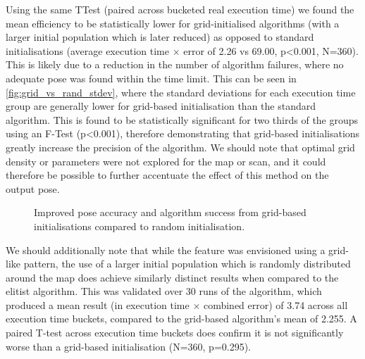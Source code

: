 \documentclass[authoryearcitations]{UoYCSproject}
\begin{document}
Using the same TTest (paired across bucketed real execution time) we found the mean efficiency to be statistically lower for grid-initialised algorithms (with a larger initial population which is later reduced) as opposed to standard initialisations (average execution time $\times$ error of 2.26 vs 69.00, p<0.001, N=360). This is likely due to a reduction in the number of algorithm failures, where no adequate pose was found within the time limit. This can be seen in \autoref{fig:grid_vs_rand_stdev}, where the standard deviations for each execution time group are generally lower for grid-based initialisation than the standard algorithm. This is found to be statistically significant for two thirds of the groups using an F-Test (p<0.001), therefore demonstrating that grid-based initialisations greatly increase the precision of the algorithm. We should note that optimal grid density or parameters were not explored for the map or scan, and it could therefore be possible to further accentuate the effect of this method on the output pose.\newline

\datatablegridstdev

\begin{figure}
	\centering
	\caption[Grid vs. random population layout]{Improved pose accuracy and algorithm success from grid-based initialisations compared to random initialisation.}
	\label{fig:grid_vs_rand_stdev}
\end{figure}

We should additionally note that while the feature was envisioned using a grid-like pattern, the use of a larger initial population which is randomly distributed around the map does achieve similarly distinct results when compared to the elitist algorithm. This was validated over 30 runs of the algorithm, which produced a mean result (in execution time $\times$ combined error) of 3.74 across all execution time buckets, compared to the grid-based algorithm's mean of 2.255. A paired T-test across execution time buckets does confirm it is not significantly worse than a grid-based initialisation (N=360, p=0.295). \newline
\end{document}
